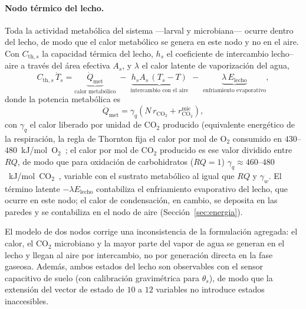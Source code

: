 \paragraph{Nodo t\'ermico del lecho.} Toda la actividad metab\'olica del sistema ---larval y microbiana--- ocurre dentro del lecho, de modo que el calor metab\'olico se genera en este nodo y no en el aire. Con $C_{\mathrm{th},s}$ la capacidad t\'ermica del lecho, $h_s$ el coeficiente de intercambio lecho--aire a trav\'es del \'area efectiva $A_s$, y $\lambda$ el calor latente de vaporizaci\'on del agua,
\begin{equation}
C_{\mathrm{th},s}\,\dot T_s = \underbrace{\dot Q_{\mathrm{met}}}_{\text{calor metab\'olico}} \;-\; \underbrace{h_s A_s\,(T_s - T)}_{\text{intercambio con el aire}} \;-\; \underbrace{\lambda\,E_{\mathrm{lecho}}}_{\text{enfriamiento evaporativo}},
\label{eq:termica-lecho}
\end{equation}
donde la potencia metab\'olica es
\begin{equation}
\dot Q_{\mathrm{met}} = \gamma_q\left(N\,r_{\mathrm{CO_2}} + r^{\mathrm{mic}}_{\mathrm{CO_2}}\right),
\label{eq:calor-metabolico}
\end{equation}
con $\gamma_q$ el calor liberado por unidad de CO$_2$ producido (equivalente energ\'etico de la respiraci\'on, la regla de Thornton fija el calor por mol de O$_2$ consumido en $430$--$480$~kJ/mol~O$_2$~\citep{thorntonRelationOxygenHeat1917,hansenUseCalorespirometricRatios2004}; el calor por mol de CO$_2$ producido es ese valor dividido entre $RQ$, de modo que para oxidaci\'on de carbohidratos ($RQ=1$) $\gamma_q \approx 460$--$480$~kJ/mol~CO$_2$~\citep{lightonMeasuringMetabolicRates2008}, variable con el sustrato metab\'olico al igual que $RQ$ y $\gamma_w$. El t\'ermino latente $-\lambda E_{\mathrm{lecho}}$ contabiliza el enfriamiento evaporativo del lecho, que ocurre en este nodo; el calor de condensaci\'on, en cambio, se deposita en las paredes y se contabiliza en el nodo de aire (Secci\'on~\ref{sec:energia}).

\begin{remark}
\label{rem:lecho-consistencia}
El modelo de dos nodos corrige una inconsistencia de la formulaci\'on agregada: el calor, el CO$_2$ microbiano y la mayor parte del vapor de agua se generan en el lecho y llegan al aire por intercambio, no por generaci\'on directa en la fase gaseosa. Adem\'as, ambos estados del lecho son observables con el sensor capacitivo de suelo (con calibraci\'on gravim\'etrica para $\theta_s$), de modo que la extensi\'on del vector de estado de $10$ a $12$ variables no introduce estados inaccesibles.
\end{remark}

